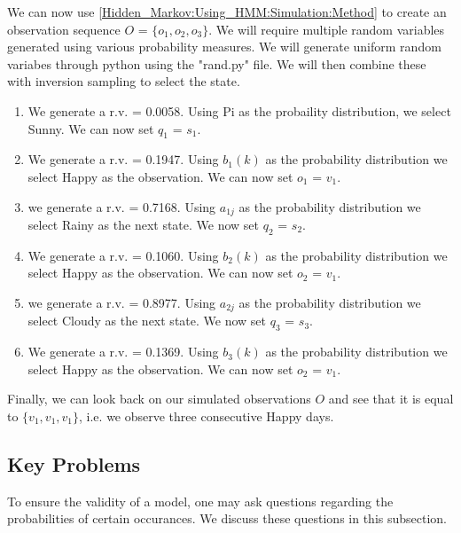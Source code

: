 \begin{example}
        We can now use \ref{Hidden_Markov:Using_HMM:Simulation:Method} to create an observation sequence   $O$ = $\{o_1, o_2, o_3\}$. We will require multiple random variables generated using various probability measures. We will generate uniform random variabes through python using the "rand.py" file. We will then combine these with inversion sampling to select the state.

        \begin{enumerate}[i]
            \item We generate a r.v. = 0.0058. Using Pi as the probaility   distribution, we select Sunny. We can now set $q_1$ = $s_1$.
            \item We generate a r.v. = 0.1947. Using $b_1(k)$ as the    probability distribution we select Happy as the observation.   We can now set $o_1$ = $v_1$.
            \item we generate a r.v. = 0.7168. Using $a_{1j}$ as the    probability distribution we select Rainy as the next state.    We now set $q_2$ = $s_2$.
            \item We generate a r.v. = 0.1060. Using $b_2(k)$ as the    probability distribution we select Happy as the observation.   We can now set $o_2$ = $v_1$.
            \item we generate a r.v. = 0.8977. Using $a_{2j}$ as the    probability distribution we select Cloudy as the next state.   We now set $q_3$ = $s_3$.
            \item We generate a r.v. = 0.1369. Using $b_3(k)$ as the    probability distribution we select Happy as the observation.   We can now set $o_2$ = $v_1$.
        \end{enumerate}
        Finally, we can look back on our simulated observations $O$ and see that it is equal to $\{v_1,v_1,v_1\}$, i.e. we observe three consecutive Happy days.
    \end{example}


    \subsection{Key Problems}
    \label{Hidden_Markov:Using_HMM:Key_Problems}

    To ensure the validity of a model, one may ask questions regarding the probabilities of certain occurances. We discuss these questions in this subsection.

